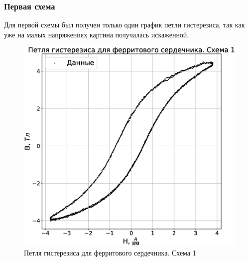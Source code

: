 \documentclass[a4paper,14pt]{extarticle}
\begin{document}
			\subsubsection{Первая схема}
				Для первой схемы был получен только один график петли гистерезиса, так как уже на малых напряжениях картина получалась искаженной. 
				\begin{figure}[h!]
					\includegraphics[width=1.0\linewidth]{Lab2_2.eps}
					\caption{Петля гистерезиса для ферритового сердечника. Схема 1}
					\label{fig5}
				\end{figure}
				\newline
\end{document}
